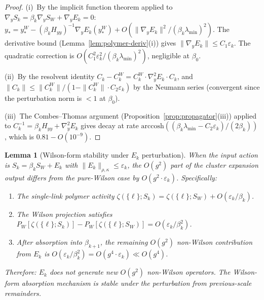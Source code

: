 \documentclass[11pt]{article}
\newtheorem{lemma}[theorem]{Lemma}
\theoremstyle{definition}
\begin{document}
\begin{proof}
(i)~By the implicit function theorem applied to
$\nabla_y S_k=\beta_k\nabla_y S_W+\nabla_y E_k=0$:
$y_*=y_*^W-(\beta_k H_{yy})^{-1}\nabla_y E_k(y_*^W)+
O(\|\nabla_y E_k\|^2/(\beta_k\lambda_{\min})^2)$.
The derivative bound (Lemma~\ref{lem:polymer-deriv}(i))
gives $\|\nabla_y E_k\|\le C_1\varepsilon_k$.
The quadratic correction is
$O(C_1^2\varepsilon_k^2/(\beta_k\lambda_{\min})^2)$,
negligible at $\beta_0$.

(ii)~By the resolvent identity
$C_k-C_k^W=C_k^W\cdot\nabla_y^2 E_k\cdot C_k$,
and $\|C_k\|\le\|C_k^W\|/(1-\|C_k^W\|\cdot C_2\varepsilon_k)$
by the Neumann series (convergent since the perturbation
norm is $<1$ at $\beta_0$).

(iii)~The Combes--Thomas argument
(Proposition~\ref{prop:propagator}(iii)) applied to
$C_k^{-1}=\beta_k H_{yy}+\nabla_y^2 E_k$ gives
decay at rate $\mathrm{arccosh}((\beta_k\lambda_{\min}
-C_2\varepsilon_k)/(2\beta_k))$, which is $0.81-O(10^{-9})$.
\end{proof}

\begin{lemma}[Wilson-form stability under $E_k$ perturbation]%
\label{lem:wilson-stable}
When the input action is $S_k=\beta_k S_W+E_k$ with
$\|E_k\|_{\rho,\kappa}\le\varepsilon_k$, the
$O(g^2)$ part of the cluster expansion output differs
from the pure-Wilson case by $O(g^2\cdot\varepsilon_k)$.
Specifically:
\begin{enumerate}[nosep,label=\textup{(\roman*)}]
\item The single-link polymer activity
$\zeta(\{\ell\};S_k)=\zeta(\{\ell\};S_W)
+O(\varepsilon_k/\beta_k)$.
\item The Wilson projection satisfies
$P_W[\zeta(\{\ell\};S_k)]-P_W[\zeta(\{\ell\};S_W)]
=O(\varepsilon_k/\beta_k^2)$.
\item After absorption into $\beta_{k+1}$, the
remaining $O(g^2)$ non-Wilson contribution from $E_k$
is $O(\varepsilon_k/\beta_k^2)=O(g^4\cdot\varepsilon_k)
\ll O(g^4)$.
\end{enumerate}
Therefore: $E_k$ does not generate new $O(g^2)$
non-Wilson operators.  The Wilson-form absorption mechanism
is stable under the perturbation from previous-scale
remainders.
\end{lemma}
\end{document}
